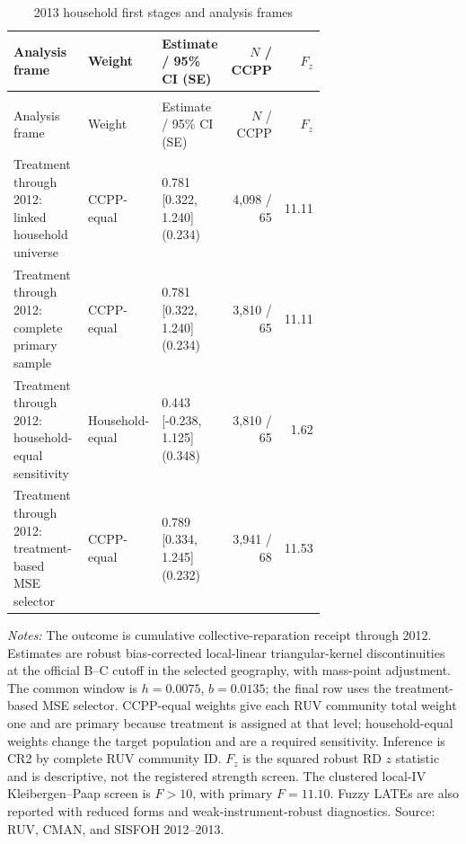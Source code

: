 \begingroup\fontsize{9.25}{11.4}\selectfont
\setlength{\tabcolsep}{3pt}\renewcommand{\arraystretch}{1.18}
\begin{longtable}{@{}>{\raggedright\arraybackslash}p{0.31\linewidth}p{0.14\linewidth}p{0.24\linewidth}rr@{}}
\caption{2013 household first stages and analysis frames}\label{tab:pub_A13} \\
\toprule Analysis frame & Weight & Estimate / 95\% CI (SE) & \(N\) / CCPP & \(F_z\) \\ \midrule\endfirsthead
\multicolumn{5}{c}{\tablename\ \thetable{} -- continued} \\
\toprule Analysis frame & Weight & Estimate / 95\% CI (SE) & \(N\) / CCPP & \(F_z\) \\ \midrule\endhead
Treatment through 2012: linked household universe & CCPP-equal & \shortstack[r]{0.781 \\{} [0.322, 1.240] \\{} (0.234)} & 4,098 / 65 & 11.11 \\
Treatment through 2012: complete primary sample & CCPP-equal & \shortstack[r]{0.781 \\{} [0.322, 1.240] \\{} (0.234)} & 3,810 / 65 & 11.11 \\
Treatment through 2012: household-equal sensitivity & Household-equal & \shortstack[r]{0.443 \\{} [-0.238, 1.125] \\{} (0.348)} & 3,810 / 65 & 1.62 \\
Treatment through 2012: treatment-based MSE selector & CCPP-equal & \shortstack[r]{0.789 \\{} [0.334, 1.245] \\{} (0.232)} & 3,941 / 68 & 11.53 \\
\bottomrule\end{longtable}
\parbox{0.97\linewidth}{\footnotesize \textit{Notes:} The outcome is cumulative collective-reparation receipt through 2012. Estimates are robust bias-corrected local-linear triangular-kernel discontinuities at the official B--C cutoff in the selected geography, with mass-point adjustment. The common window is \(h=0.0075\), \(b=0.0135\); the final row uses the treatment-based MSE selector. CCPP-equal weights give each RUV community total weight one and are primary because treatment is assigned at that level; household-equal weights change the target population and are a required sensitivity. Inference is CR2 by complete RUV community ID. \(F_z\) is the squared robust RD \(z\) statistic and is descriptive, not the registered strength screen. The clustered local-IV Kleibergen--Paap screen is \(F>10\), with primary \(F=11.10\). Fuzzy LATEs are also reported with reduced forms and weak-instrument-robust diagnostics. Source: RUV, CMAN, and SISFOH 2012--2013.}
